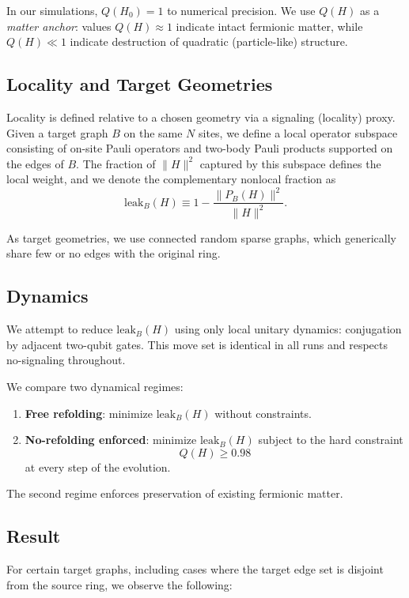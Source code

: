 In our simulations, $Q(H_0)=1$ to numerical precision. We use $Q(H)$ as a
\emph{matter anchor}: values $Q(H)\approx 1$ indicate intact fermionic matter,
while $Q(H)\ll 1$ indicate destruction of quadratic (particle-like) structure.

\subsection*{Locality and Target Geometries}

Locality is defined relative to a chosen geometry via a signaling (locality) proxy.
Given a target graph $B$ on the same $N$ sites, we define a local operator subspace
consisting of on-site Pauli operators and two-body Pauli products supported on the edges
of $B$. The fraction of $\|H\|^2$ captured by this subspace defines the local weight,
and we denote the complementary nonlocal fraction as
\[
\mathrm{leak}_B(H) \equiv 1 - \frac{\|P_B(H)\|^2}{\|H\|^2}.
\]

As target geometries, we use connected random sparse graphs, which generically share
few or no edges with the original ring.

\subsection*{Dynamics}

We attempt to reduce $\mathrm{leak}_B(H)$ using only local unitary dynamics: conjugation
by adjacent two-qubit gates. This move set is identical in all runs and respects
no-signaling throughout.

We compare two dynamical regimes:
\begin{enumerate}
  \item \textbf{Free refolding}: minimize $\mathrm{leak}_B(H)$ without constraints.
  \item \textbf{No-refolding enforced}: minimize $\mathrm{leak}_B(H)$ subject to the
        hard constraint
        \[
        Q(H) \ge 0.98
        \]
        at every step of the evolution.
\end{enumerate}

The second regime enforces preservation of existing fermionic matter.

\subsection*{Result}

For certain target graphs, including cases where the target edge set is disjoint from
the source ring, we observe the following:


